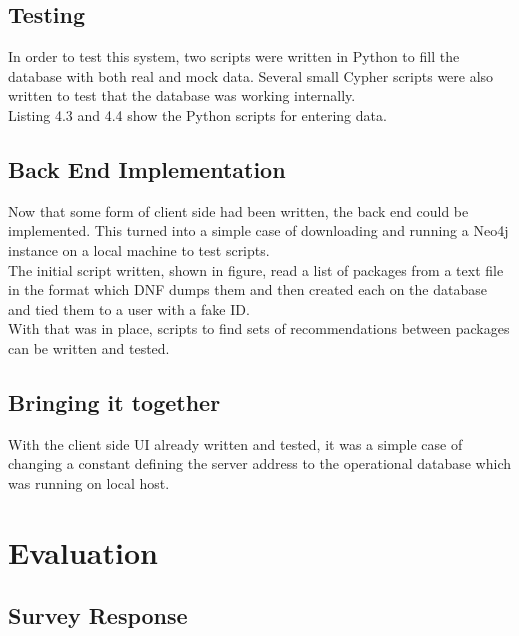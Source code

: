 \documentclass{l4proj}
\begin{document}
\section{Testing}
In order to test this system, two scripts were written in Python to fill the database with both real and mock data. Several small Cypher scripts were also written to test that the database was working internally.\\
Listing 4.3 and 4.4 show the Python scripts for entering data.\\
\begin{figure}

\end{figure}
\begin{figure}

\end{figure}

\section{Back End Implementation}
Now that some form of client side had been written, the back end could be implemented. This turned into a simple case of downloading and running a Neo4j instance on a local machine to test scripts.\\
The initial script written, shown in figure, read a list of packages from a text file in the format which DNF dumps them and then created each on the database and tied them to a user with a fake ID.\\
With that was in place, scripts to find sets of recommendations between packages can be written and tested.

\section{Bringing it together}
With the client side UI already written and tested, it was a simple case of changing a constant defining the server address to the operational database which was running on local host.
 
 
\chapter{Evaluation}
\section{Survey Response}
 
\end{document}
